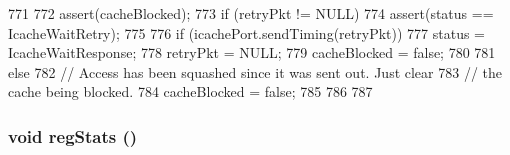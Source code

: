 \begin{DoxyCode}
771 {
772     assert(cacheBlocked);
773     if (retryPkt != NULL) {
774         assert(status == IcacheWaitRetry);
775 
776         if (icachePort.sendTiming(retryPkt)) {
777             status = IcacheWaitResponse;
778             retryPkt = NULL;
779             cacheBlocked = false;
780         }
781     } else {
782         // Access has been squashed since it was sent out.  Just clear
783         // the cache being blocked.
784         cacheBlocked = false;
785     }
786 
787 }
\end{DoxyCode}
\hypertarget{classFrontEnd_a4dc637449366fcdfc4e764cdf12d9b11}{
\subsubsection[{regStats}]{\setlength{\rightskip}{0pt plus 5cm}void regStats ()}}
\label{classFrontEnd_a4dc637449366fcdfc4e764cdf12d9b11}



